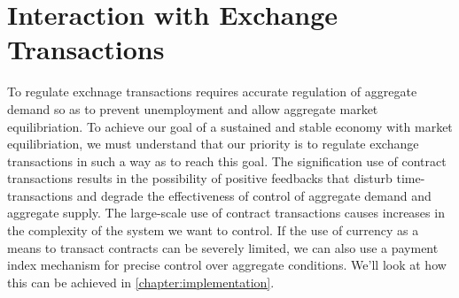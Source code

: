 \section{Interaction with Exchange Transactions}

To regulate exchnage transactions requires accurate regulation of aggregate demand so as to prevent
unemployment and allow aggregate market equilibriation. To achieve our goal of a sustained and
stable economy with market equilibriation, we must understand that our priority is to regulate
exchange transactions in such a way as to reach this goal. The signification use of contract
transactions results in the possibility of positive feedbacks that disturb time-transactions and
degrade the effectiveness of control of aggregate demand and aggregate supply. The large-scale use
of contract transactions causes increases in the complexity of the system we want to control. If the
use of currency as a means to transact contracts can be severely limited, we can also use a payment
index mechanism for precise control over aggregate conditions.  We'll look at how this can be
achieved in \ref{chapter:implementation}. 


